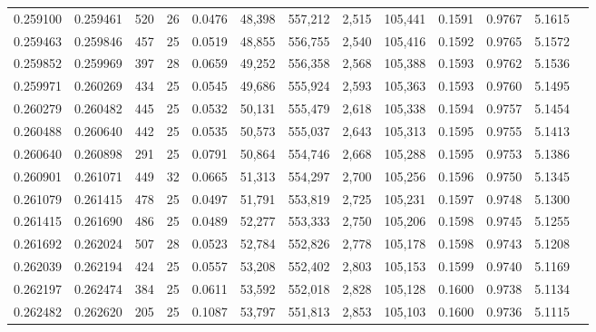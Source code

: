 \begin{tabular}{rrrrrrrrrrrrr}
0.259100 & 0.259461 & 520 &  26 &                                     0.0476 &  48,398 & 557,212 &   2,515 & 105,441 & 0.1591 & 0.9767 & 5.1615 \\
0.259463 & 0.259846 & 457 &  25 &                                     0.0519 &  48,855 & 556,755 &   2,540 & 105,416 & 0.1592 & 0.9765 & 5.1572 \\
0.259852 & 0.259969 & 397 &  28 &                                     0.0659 &  49,252 & 556,358 &   2,568 & 105,388 & 0.1593 & 0.9762 & 5.1536 \\
0.259971 & 0.260269 & 434 &  25 &                                     0.0545 &  49,686 & 555,924 &   2,593 & 105,363 & 0.1593 & 0.9760 & 5.1495 \\
0.260279 & 0.260482 & 445 &  25 &                                     0.0532 &  50,131 & 555,479 &   2,618 & 105,338 & 0.1594 & 0.9757 & 5.1454 \\
0.260488 & 0.260640 & 442 &  25 &                                     0.0535 &  50,573 & 555,037 &   2,643 & 105,313 & 0.1595 & 0.9755 & 5.1413 \\
0.260640 & 0.260898 & 291 &  25 &                                     0.0791 &  50,864 & 554,746 &   2,668 & 105,288 & 0.1595 & 0.9753 & 5.1386 \\
0.260901 & 0.261071 & 449 &  32 &                                     0.0665 &  51,313 & 554,297 &   2,700 & 105,256 & 0.1596 & 0.9750 & 5.1345 \\
0.261079 & 0.261415 & 478 &  25 &                                     0.0497 &  51,791 & 553,819 &   2,725 & 105,231 & 0.1597 & 0.9748 & 5.1300 \\
0.261415 & 0.261690 & 486 &  25 &                                     0.0489 &  52,277 & 553,333 &   2,750 & 105,206 & 0.1598 & 0.9745 & 5.1255 \\
0.261692 & 0.262024 & 507 &  28 &                                     0.0523 &  52,784 & 552,826 &   2,778 & 105,178 & 0.1598 & 0.9743 & 5.1208 \\
0.262039 & 0.262194 & 424 &  25 &                                     0.0557 &  53,208 & 552,402 &   2,803 & 105,153 & 0.1599 & 0.9740 & 5.1169 \\
0.262197 & 0.262474 & 384 &  25 &                                     0.0611 &  53,592 & 552,018 &   2,828 & 105,128 & 0.1600 & 0.9738 & 5.1134 \\
0.262482 & 0.262620 & 205 &  25 &                                     0.1087 &  53,797 & 551,813 &   2,853 & 105,103 & 0.1600 & 0.9736 & 5.1115 \\

\end{tabular}
